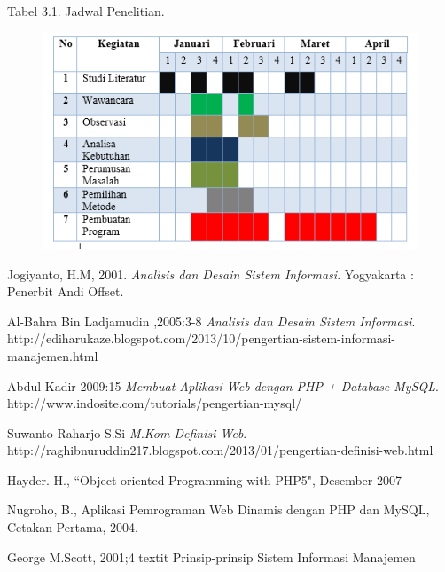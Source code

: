 \documentclass{jtetiproposalskripsi}
\begin{document}
\begin{center}
Tabel 3.1. Jadwal Penelitian.
\end{center}
\vspace{-0.5cm}
\begin{figure}[ht!]
  \centering
    \includegraphics[width=1\textwidth]{gambar/jadwal}
\end{figure}


\begin{thebibliography}{9}

Jogiyanto, H.M, 2001. \textit{Analisis dan Desain Sistem Informasi}. Yogyakarta : Penerbit Andi Offset. 

Al-Bahra Bin Ladjamudin ,2005:3-8  \textit {Analisis dan Desain Sistem Informasi}. 
http://ediharukaze.blogspot.com/2013/10/pengertian-sistem-informasi-manajemen.html


Abdul Kadir 2009:15\textit{ Membuat Aplikasi Web dengan PHP + Database MySQL}. http://www.indosite.com/tutorials/pengertian-mysql/


Suwanto Raharjo S.Si \textit { M.Kom Definisi Web}. http://raghibnuruddin217.blogspot.com/2013/01/pengertian-definisi-web.html

Hayder. H.,  “Object-oriented Programming with PHP5", Desember 2007 

 Nugroho, B., Aplikasi Pemrograman Web Dinamis dengan PHP dan MySQL, Cetakan
Pertama, 2004. 

George M.Scott, 2001;4 textit { Prinsip-prinsip Sistem Informasi Manajemen }

\end{thebibliography}
\end{document}
